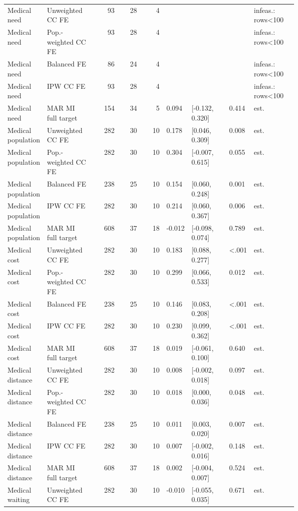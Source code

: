 \begin{longtable}{@{}p{0.13\linewidth}p{0.16\linewidth}rrrp{0.055\linewidth}p{0.135\linewidth}p{0.055\linewidth}p{0.15\linewidth}@{}}
Medical need & Unweighted CC FE & 93 & 28 & 4 &  &  &  & infeas.: rows<100 \\
Medical need & Pop.-weighted CC FE & 93 & 28 & 4 &  &  &  & infeas.: rows<100 \\
Medical need & Balanced FE & 86 & 24 & 4 &  &  &  & infeas.: rows<100 \\
Medical need & IPW CC FE & 93 & 28 & 4 &  &  &  & infeas.: rows<100 \\
Medical need & MAR MI full target & 154 & 34 & 5 & 0.094 & [-0.132, 0.320] & 0.414 & est. \\
Medical population & Unweighted CC FE & 282 & 30 & 10 & 0.178 & [0.046, 0.309] & 0.008 & est. \\
Medical population & Pop.-weighted CC FE & 282 & 30 & 10 & 0.304 & [-0.007, 0.615] & 0.055 & est. \\
Medical population & Balanced FE & 238 & 25 & 10 & 0.154 & [0.060, 0.248] & 0.001 & est. \\
Medical population & IPW CC FE & 282 & 30 & 10 & 0.214 & [0.060, 0.367] & 0.006 & est. \\
Medical population & MAR MI full target & 608 & 37 & 18 & -0.012 & [-0.098, 0.074] & 0.789 & est. \\
Medical cost & Unweighted CC FE & 282 & 30 & 10 & 0.183 & [0.088, 0.277] & <.001 & est. \\
Medical cost & Pop.-weighted CC FE & 282 & 30 & 10 & 0.299 & [0.066, 0.533] & 0.012 & est. \\
Medical cost & Balanced FE & 238 & 25 & 10 & 0.146 & [0.083, 0.208] & <.001 & est. \\
Medical cost & IPW CC FE & 282 & 30 & 10 & 0.230 & [0.099, 0.362] & <.001 & est. \\
Medical cost & MAR MI full target & 608 & 37 & 18 & 0.019 & [-0.061, 0.100] & 0.640 & est. \\
Medical distance & Unweighted CC FE & 282 & 30 & 10 & 0.008 & [-0.002, 0.018] & 0.097 & est. \\
Medical distance & Pop.-weighted CC FE & 282 & 30 & 10 & 0.018 & [0.000, 0.036] & 0.048 & est. \\
Medical distance & Balanced FE & 238 & 25 & 10 & 0.011 & [0.003, 0.020] & 0.007 & est. \\
Medical distance & IPW CC FE & 282 & 30 & 10 & 0.007 & [-0.002, 0.016] & 0.148 & est. \\
Medical distance & MAR MI full target & 608 & 37 & 18 & 0.002 & [-0.004, 0.007] & 0.524 & est. \\
Medical waiting & Unweighted CC FE & 282 & 30 & 10 & -0.010 & [-0.055, 0.035] & 0.671 & est. \\

\end{longtable}
